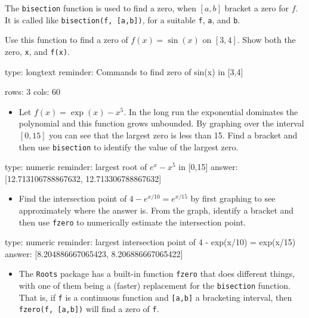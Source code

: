 \documentclass[12pt]{article}
\begin{document}
The \texttt{bisection} function is used to find a zero, when $[a,b]$
bracket a zero for $f$. It is called like
\texttt{bisection(f, {[}a,b{]})}, for a suitable \texttt{f}, \texttt{a},
and \texttt{b}.

Use this function to find a zero of $f(x) = \sin(x)$ on $[3,4]$. Show
both the zero, \texttt{x}, and \texttt{f(x)}.

\begin{answer}
type: longtext
reminder: Commands to find zero of sin(x) in [3,4]

rows: 3
cols: 60
\end{answer}

\begin{itemize}
\itemsep1pt\parskip0pt
\item
  Let $f(x) = \exp(x) - x^5$. In the long run the exponential dominates
  the polynomial and this function grows unbounded. By graphing over the
  interval $[0,15]$ you can see that the largest zero is less than 15.
  Find a bracket and then use \texttt{bisection} to identify the value
  of the largest zero.
\end{itemize}

\begin{answer}
    type: numeric
    reminder: largest root of \( e^x - x^5 \) in [0,15]
    answer: [12.713106788867632, 12.713306788867632]

\end{answer}

\begin{itemize}
\itemsep1pt\parskip0pt
\item
  Find the intersection point of $4 - e^{x/10} = e^{x/15}$ by first
  graphing to see approximately where the answer is. From the graph,
  identify a bracket and then use \texttt{fzero} to numerically estimate
  the intersection point.
\end{itemize}

\begin{answer}
    type: numeric
    reminder: largest intersection point of  4 - exp(x/10) = exp(x/15)
    answer: [8.204886667065423, 8.206886667065422]

\end{answer}

\begin{itemize}
\itemsep1pt\parskip0pt
\item
  The \texttt{Roots} package has a built-in function \texttt{fzero} that
  does different things, with one of them being a (faster) replacement
  for the \texttt{bisection} function. That is, if \texttt{f} is a
  continuous function and \texttt{{[}a,b{]}} a bracketing interval, then
  \texttt{fzero(f, {[}a,b{]})} will find a zero of \texttt{f}.
\end{itemize}
\end{document}
